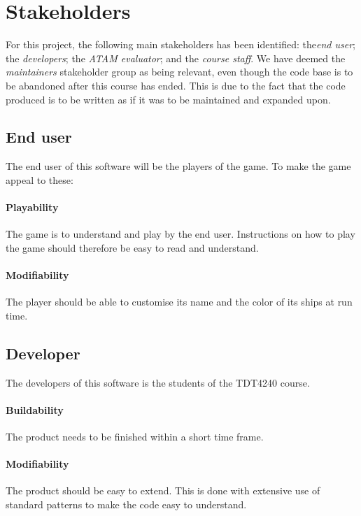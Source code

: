 \chapter{Stakeholders}
\label{cha:stakeholders}
For this project, the following main stakeholders has been identified: the\emph{end user}; the \emph{developers}; the \emph{ATAM evaluator}; and the \emph{course staff}. We have deemed the \emph{maintainers} stakeholder group as being relevant, even though the code base is to be abandoned after this course has ended. This is due to the fact that the code produced is to be written as if it was to be maintained and expanded upon.


    
    \section{End user}
    The end user of this software will be the players of the game. To make the game appeal to these:

        \subsubsection*{Playability}
        The game is to understand and play by the end user. Instructions on how to play the game should therefore be easy to read and understand.

        \subsubsection*{Modifiability}
        The player should be able to customise its name and the color of its ships at run time.
    
    
    \section{Developer}
    The developers of this software is the students of the TDT4240 course.

        \subsubsection*{Buildability}
        The product needs to be finished within a short time frame.
        
        \subsubsection*{Modifiability}
        The product should be easy to extend. This is done with extensive use of standard patterns to make the code easy to understand.

